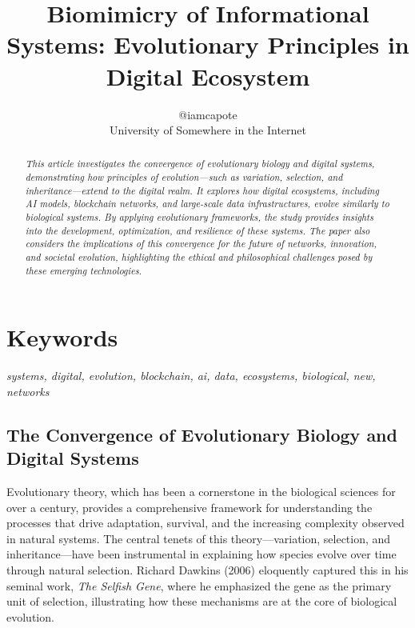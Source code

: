 \documentclass[12pt,twoside]{article}
\begin{document}
\onecolumn
\title{Biomimicry of Informational Systems: Evolutionary Principles in Digital Ecosystem}
\author{@iamcapote \\ \small University of Somewhere in the Internet}
\date{\vspace{-5ex}} %
\maketitle

\begin{abstract}
\noindent\textit{This article investigates the convergence of evolutionary biology and digital systems, demonstrating how principles of evolution—such as variation, selection, and inheritance—extend to the digital realm. It explores how digital ecosystems, including AI models, blockchain networks, and large-scale data infrastructures, evolve similarly to biological systems. By applying evolutionary frameworks, the study provides insights into the development, optimization, and resilience of these systems. The paper also considers the implications of this convergence for the future of networks, innovation, and societal evolution, highlighting the ethical and philosophical challenges posed by these emerging technologies.}
\end{abstract}

\section{Keywords}
\noindent\textit{systems, digital, evolution, blockchain, ai, data, ecosystems, biological, new, networks}

\newpage


\subsection{The Convergence of Evolutionary Biology and Digital Systems}

Evolutionary theory, which has been a cornerstone in the biological sciences for over a century, provides a comprehensive framework for understanding the processes that drive adaptation, survival, and the increasing complexity observed in natural systems. The central tenets of this theory—variation, selection, and inheritance—have been instrumental in explaining how species evolve over time through natural selection. Richard Dawkins (2006) eloquently captured this in his seminal work, \textit{The Selfish Gene}, where he emphasized the gene as the primary unit of selection, illustrating how these mechanisms are at the core of biological evolution.
\end{document}
